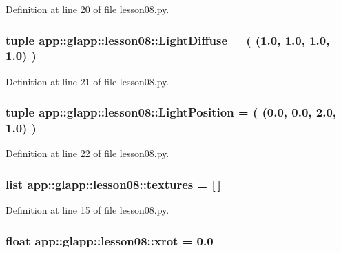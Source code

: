 Definition at line 20 of file lesson08.py.
\subsubsection{\setlength{\rightskip}{0pt plus 5cm}tuple {\bf app::glapp::lesson08::LightDiffuse} = ( (1.0, 1.0, 1.0, 1.0) )\hspace{0.3cm}{\tt  [static]}}\label{namespaceapp_1_1glapp_1_1lesson08_ea8751b540dfebc38bf93e04da6ada92}




Definition at line 21 of file lesson08.py.
\subsubsection{\setlength{\rightskip}{0pt plus 5cm}tuple {\bf app::glapp::lesson08::LightPosition} = ( (0.0, 0.0, 2.0, 1.0) )\hspace{0.3cm}{\tt  [static]}}\label{namespaceapp_1_1glapp_1_1lesson08_a9d28f3e9060468636b17b63f9273fb0}




Definition at line 22 of file lesson08.py.
\subsubsection{\setlength{\rightskip}{0pt plus 5cm}list {\bf app::glapp::lesson08::textures} = [$\,$]\hspace{0.3cm}{\tt  [static]}}\label{namespaceapp_1_1glapp_1_1lesson08_cb17887fc132e454b3f081a0f39788ac}




Definition at line 15 of file lesson08.py.
\subsubsection{\setlength{\rightskip}{0pt plus 5cm}float {\bf app::glapp::lesson08::xrot} = 0.0\hspace{0.3cm}{\tt  [static]}}\label{namespaceapp_1_1glapp_1_1lesson08_1fedae509d03e3649da13e7ef6c8867c}




